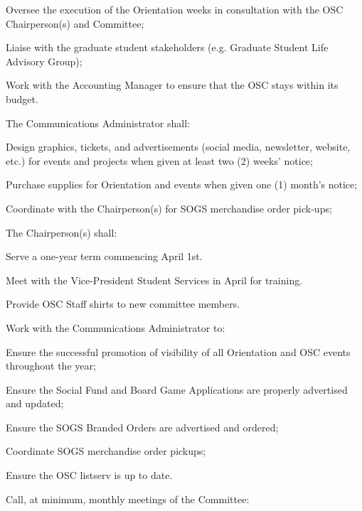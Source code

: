 \begin{longenum}[ label*=\thesubsection.\arabic*., align=left]
\begin{longenum}[label*=\arabic*., align=left]
\begin{longenum}[label*=\arabic*., align=left]
			\item Oversee the execution of the Orientation weeks in consultation with the OSC Chairperson(s) and Committee;			
			\item Liaise with the graduate student stakeholders (e.g. Graduate Student Life Advisory Group);
			\item Work with the Accounting Manager to ensure that the OSC stays within its budget.
			\end{longenum}
		\item The Communications Administrator shall:		
			\begin{longenum}[label*=\arabic*., align=left]
			\item Design graphics, tickets, and advertisements (social media, newsletter, website, etc.) for events and projects when given at least two (2) weeks' notice;
			\item Purchase supplies for Orientation and events when given one (1) month's notice;
			\item Coordinate with the Chairperson(s) for SOGS merchandise order pick-ups;
			\end{longenum}			
		\item The Chairperson(s) shall:
			\begin{longenum}[label*=\arabic*., align=left]
			\item Serve a one-year term commencing April 1st.
			\item Meet with the Vice-President Student Services in April for training.
			\item Provide OSC Staff shirts to new committee members.
			\item Work with the Communications Administrator to:
				\begin{longenum}[label*=\arabic*., align=left]			
				\item Ensure the successful promotion of visibility of all Orientation and OSC events throughout the year;
				\item Ensure the Social Fund and Board Game Applications are properly advertised and updated;
				\item Ensure the SOGS Branded Orders are advertised and ordered;
				\item Coordinate SOGS merchandise order pickups;
				\item Ensure the OSC listserv is up to date.											
				\end{longenum}				
			\item Call, at minimum, monthly meetings of the Committee:

\end{longenum}
\end{longenum}
\end{longenum}
